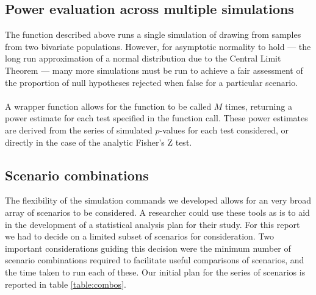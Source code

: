 \subsection{Power evaluation across multiple simulations}
The  function described above runs a single simulation of drawing from samples from two bivariate populations.  However, for asymptotic normality to hold --- the long run approximation of a normal distribution due to the Central Limit Theorem \cite{Casella2002} --- many more simulations must be run to achieve a fair assessment of the proportion of null hypotheses rejected when false for a particular scenario.
\\
\\
A wrapper function  allows for the  function to be called $M$ times, returning a power estimate for each test specified in the function call.  These power estimates are derived from the series of simulated $p$-values for each test considered, or directly in the case of the analytic Fisher's Z test.

\subsection{Scenario combinations}
The flexibility of the simulation commands we developed allows for an very broad array of scenarios to be considered.  A researcher could use these tools as is to aid in the development of a statistical analysis plan for their study.  For this report we had to decide on a limited subset of scenarios for consideration.  Two important considerations guiding this decision were the minimum number of scenario combinations required to facilitate useful comparisons of scenarios, and the time taken to run each of these.  Our initial plan for the series of scenarios is reported in table \ref{table:combos}.
\\

